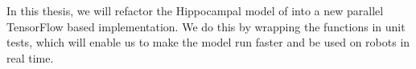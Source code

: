 In this thesis, we will refactor the Hippocampal model of \cite{saul2011} into a new parallel TensorFlow based implementation.
We do this by wrapping the functions in unit tests, which will enable us to make the model run faster and be used on robots in real time.


%